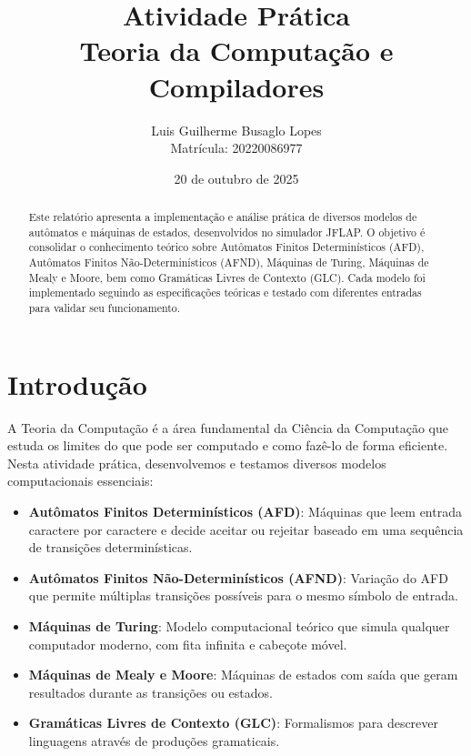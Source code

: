 \documentclass[12pt,a4paper]{article}
\title{\textbf{Atividade Prática} \\ \large Teoria da Computação e Compiladores}
\author{Luis Guilherme Busaglo Lopes \\ Matrícula: 20220086977}
\date{20 de outubro de 2025}
\begin{document}
\maketitle

\begin{abstract}
Este relatório apresenta a implementação e análise prática de diversos modelos de autômatos e máquinas de estados, desenvolvidos no simulador JFLAP. O objetivo é consolidar o conhecimento teórico sobre Autômatos Finitos Determinísticos (AFD), Autômatos Finitos Não-Determinísticos (AFND), Máquinas de Turing, Máquinas de Mealy e Moore, bem como Gramáticas Livres de Contexto (GLC). Cada modelo foi implementado seguindo as especificações teóricas e testado com diferentes entradas para validar seu funcionamento.
\end{abstract}

\tableofcontents
\newpage

\section{Introdução}

A Teoria da Computação é a área fundamental da Ciência da Computação que estuda os limites do que pode ser computado e como fazê-lo de forma eficiente. Nesta atividade prática, desenvolvemos e testamos diversos modelos computacionais essenciais:

\begin{itemize}
    \item \textbf{Autômatos Finitos Determinísticos (AFD)}: Máquinas que leem entrada caractere por caractere e decide aceitar ou rejeitar baseado em uma sequência de transições determinísticas.
    
    \item \textbf{Autômatos Finitos Não-Determinísticos (AFND)}: Variação do AFD que permite múltiplas transições possíveis para o mesmo símbolo de entrada.
    
    \item \textbf{Máquinas de Turing}: Modelo computacional teórico que simula qualquer computador moderno, com fita infinita e cabeçote móvel.
    
    \item \textbf{Máquinas de Mealy e Moore}: Máquinas de estados com saída que geram resultados durante as transições ou estados.
    
    \item \textbf{Gramáticas Livres de Contexto (GLC)}: Formalismos para descrever linguagens através de produções gramaticais.
\end{itemize}
\end{document}
